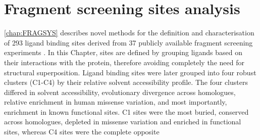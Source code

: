 
\section{Fragment screening sites analysis}


\autoref{chap:FRAGSYS} describes novel methods for the definition and characterisation of 293 ligand binding sites derived from 37 publicly available fragment screening experiments \cite{UTGES_2024_FRAGSYS}. In this Chapter, sites are defined by grouping ligands based on their interactions with the protein, therefore avoiding completely the need for structural superposition. Ligand binding sites were later grouped into four robust clusters (C1-C4) by their relative solvent accessibility profile. The four clusters differed in solvent accessibility, evolutionary divergence across homologues, relative enrichment in human missense variation, and most importantly, enrichment in known functional sites. C1 sites were the most buried, conserved across homologues, depleted in missense variation and enriched in functional sites, whereas C4 sites were the complete opposite



